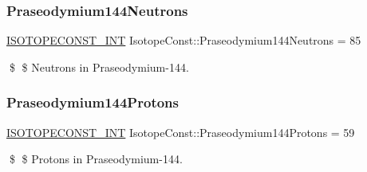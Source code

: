\subsubsection{\texorpdfstring{Praseodymium144\+Neutrons}{Praseodymium144Neutrons}}
{\footnotesize\ttfamily \mbox{\hyperlink{group___isotope_const-_macros_ga5f18360b3e99483a35c32d789e62621c}{I\+S\+O\+T\+O\+P\+E\+C\+O\+N\+S\+T\+\_\+\+I\+NT}} Isotope\+Const\+::\+Praseodymium144\+Neutrons = 85}

\$ \$ Neutrons in Praseodymium-\/144. \mbox{\label{group___isotope_const-_praseodymium-_pr144_ga0458982aed921161774956717840134d}} 
\subsubsection{\texorpdfstring{Praseodymium144\+Protons}{Praseodymium144Protons}}
{\footnotesize\ttfamily \mbox{\hyperlink{group___isotope_const-_macros_ga5f18360b3e99483a35c32d789e62621c}{I\+S\+O\+T\+O\+P\+E\+C\+O\+N\+S\+T\+\_\+\+I\+NT}} Isotope\+Const\+::\+Praseodymium144\+Protons = 59}

\$ \$ Protons in Praseodymium-\/144. 